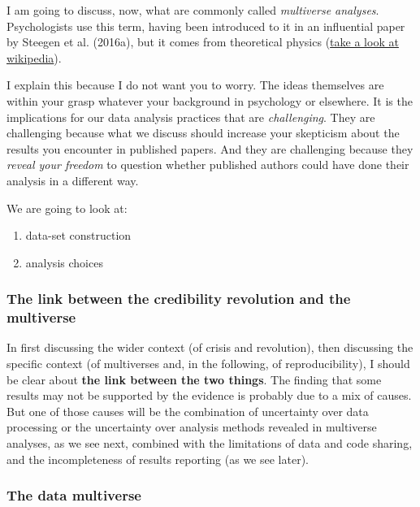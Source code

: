 \documentclass[
  letterpaper,
  DIV=11,
  numbers=noendperiod]{scrreprt}
\providecommand{\tightlist}{%
  \setlength{\itemsep}{0pt}\setlength{\parskip}{0pt}}\usepackage{longtable,booktabs,array}
\begin{document}
I am going to discuss, now, what are commonly called \emph{multiverse
analyses}. Psychologists use this term, having been introduced to it in
an influential paper by Steegen et al. (2016a), but it comes from
theoretical physics
(\href{https://en.wikipedia.org/wiki/Multiverse}{take a look at
wikipedia}).

I explain this because I do not want you to worry. The ideas themselves
are within your grasp whatever your background in psychology or
elsewhere. It is the implications for our data analysis practices that
are \emph{challenging}. They are challenging because what we discuss
should increase your skepticism about the results you encounter in
published papers. And they are challenging because they \emph{reveal
your freedom} to question whether published authors could have done
their analysis in a different way.

We are going to look at:

\begin{enumerate}
\def\labelenumi{\arabic{enumi}.}
\tightlist
\item
  data-set construction
\item
  analysis choices
\end{enumerate}

\hypertarget{the-link-between-the-credibility-revolution-and-the-multiverse}{%
\subsubsection{The link between the credibility revolution and the
multiverse}\label{the-link-between-the-credibility-revolution-and-the-multiverse}}

In first discussing the wider context (of crisis and revolution), then
discussing the specific context (of multiverses and, in the following,
of reproducibility), I should be clear about \textbf{the link between
the two things}. The finding that some results may not be supported by
the evidence is probably due to a mix of causes. But one of those causes
will be the combination of uncertainty over data processing or the
uncertainty over analysis methods revealed in multiverse analyses, as we
see next, combined with the limitations of data and code sharing, and
the incompleteness of results reporting (as we see later).

\hypertarget{sec-multiversedata}{%
\subsubsection{The data multiverse}\label{sec-multiversedata}}
\end{document}
